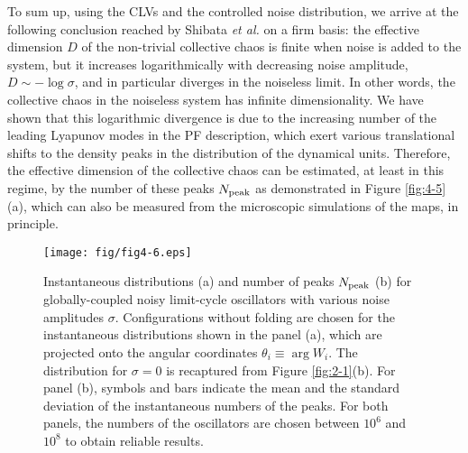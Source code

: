 \documentclass[12pt]{iopart}
\begin{document}
To sum up, using the CLVs and the controlled noise distribution,
 we arrive at the following conclusion reached by Shibata \textit{et al.}
 \cite{Shibata.etal-PRL1999} on a firm basis:
 the effective dimension $D$ of the non-trivial collective chaos
 is finite when noise is added to the system,
 but it increases logarithmically with decreasing noise amplitude,
 $D \sim -\log\sigma$, and in particular diverges in the noiseless limit.
In other words, the collective chaos in the noiseless system
 has infinite dimensionality.
We have shown that this logarithmic divergence is
 due to the increasing number of the leading Lyapunov modes
 in the PF description, which exert various translational shifts
 to the density peaks in the distribution of the dynamical units.
Therefore, the effective dimension of the collective chaos
 can be estimated, at least in this regime,
 by the number of these peaks $N_{\rm peak}$
 as demonstrated in Figure \ref{fig:4-5}(a),
 which can also be measured from the microscopic simulations of the maps,
 in principle.

\begin{figure}[t]
 \begin{center}
  \texttt{[image: fig/fig4-6.eps]}
  \caption{Instantaneous distributions (a) and number of peaks $N_{\rm peak}$ (b) for globally-coupled noisy limit-cycle oscillators  with various noise amplitudes $\sigma$. Configurations without folding are chosen for the instantaneous distributions shown in the panel (a), which are projected onto the angular coordinates $\theta_i \equiv \arg W_i$. The distribution for $\sigma = 0$ is recaptured from Figure \ref{fig:2-1}(b). For panel (b), symbols and bars indicate the mean and the standard deviation of the instantaneous numbers of the peaks. For both panels, the numbers of the oscillators are chosen between $10^6$ and $10^8$ to obtain reliable results.}
  \label{fig:4-6}
 \end{center}
\end{figure}%
\end{document}
